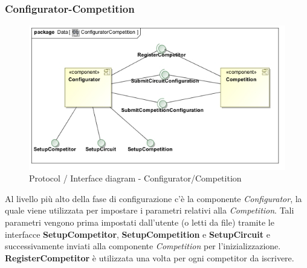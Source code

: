 \subsubsection{Configurator-Competition}
\begin{center}
\begin{figure}[h!]
	\includegraphics[scale=0.55]{img/InteractionDiagram/Implementation_Diagram__ConfiguratorCompetition.jpg}
\caption{Protocol / Interface diagram - Configurator/Competition}
\end{figure}
\end{center}
Al livello pi\`{u} alto della fase di configurazione c'\`{e} la componente \emph{Configurator}, la quale viene utilizzata per impostare i parametri
relativi alla \emph{Competition}. Tali parametri vengono prima impostati dall'utente (o letti da file) tramite le interfacce \textbf{SetupCompetitor},
\textbf{SetupCompetition} e \textbf{SetupCircuit} e successivamente inviati alla componente \emph{Competition} per l'inizializzazione.\\
\textbf{RegisterCompetitor} \`{e} utilizzata una volta per ogni competitor da iscrivere.
